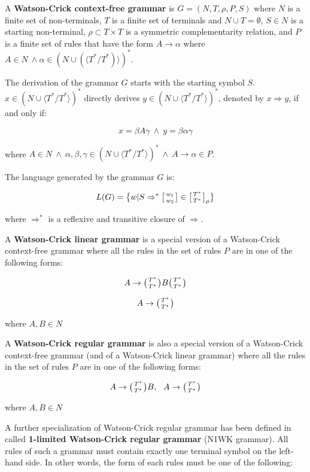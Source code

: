 A \textbf{Watson-Crick context-free grammar} is $G = (N, T, \rho, P, S)$ where $N$ is a finite set of non-terminals, $T$ is a finite set of terminals and $N \cup T = \emptyset$, $S \in N$ is a starting non-terminal, $\rho \subset T \times T$ is a symmetric complementarity relation, and $P$ is a finite set of rules that have the form $A \rightarrow \alpha$ where $A \in N \: \wedge \alpha \in (N \cup (\langle T^*/T^*)\rangle)^*$.

The derivation of the grammar $G$ starts with the starting symbol $S$. $x \in (N \cup \langle T^*/T^* \rangle)^*$ directly derives $y \in (N \cup \langle T^*/T^* \rangle)^*$, denoted by $x \Rightarrow y$, if and only if:

$$x = \beta A \gamma \: \wedge \: y = \beta \alpha \gamma$$

where $A \in N \: \wedge \: \alpha, \beta, \gamma \in (N \cup \langle T^*/T^* \rangle)^* \: \wedge \: A \rightarrow \alpha \in P$.

The language generated by the grammar $G$ is:

$$L(G) = \big\{ w| S \Rightarrow^* \wkdomain{w_1}{w_2} \in \wkdomain{T^*}{T^*}_{\rho} \big\}$$

where $\Rightarrow^*$ is a reflexive and transitive closure of $\Rightarrow$.

A \textbf{Watson-Crick linear grammar} is a special version of a Watson-Crick context-free grammar where all the rules in the set of rules $P$ are in one of the following forms:

$$A \rightarrow \wkpair{T^*}{T^*} B \wkpair{T^*}{T^*}$$

$$A \rightarrow \wkpair{T^*}{T^*}$$

where $A, B \in N$

A \textbf{Watson-Crick regular grammar} is also a special version of a Watson-Crick context-free grammar (and of a Watson-Crick linear grammar) where all the rules in the set of rules $P$ are in one of the following forms:

$$A \rightarrow \wkpair{T^*}{T^*} B, \:\:\: A \rightarrow \wkpair{T^*}{T^*}$$

where $A, B \in N$

A further specialization of Watson-Crick regular grammar has been defined in \cite{REG_GRAMMAR} called \textbf{1-limited Watson-Crick regular grammar} (N1WK grammar). All rules of such a grammar must contain exactly one terminal symbol on the left-hand side. In other words, the form of each rules must be one of the following:

